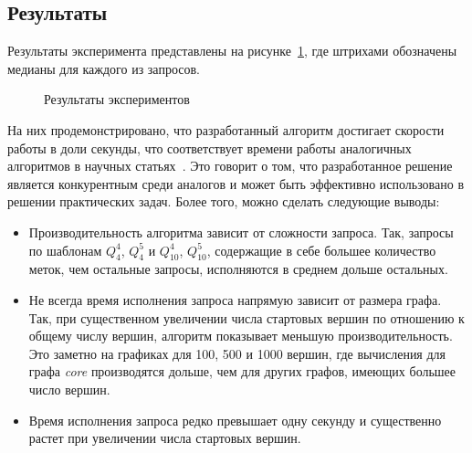 \subsection{Результаты}
Результаты эксперимента представлены на рисунке~\ref{fig:experiment}, где штрихами обозначены медианы для каждого из запросов.

\begin{figure}[ht]
  \noindent{}
  \caption{Результаты экспериментов}
  \label{fig:experiment}
\end{figure}

На них продемонстрировано, что разработанный алгоритм достигает скорости работы в доли секунды, что соответствует времени работы аналогичных алгоритмов в научных статьях~\cite{experimet_wang2020}. Это говорит о том, что разработанное решение является конкурентным среди аналогов и может быть эффективно использовано в решении практических задач. Более того, можно сделать следующие выводы:

\begin{itemize}
    \item Производительность алгоритма зависит от сложности запроса. Так, запросы по шаблонам $Q^4_4$, $Q^5_4$ и $Q^4_{10}$, $Q^5_{10}$, содержащие в себе большее количество меток, чем остальные запросы, исполняются в среднем дольше остальных. 
    \item Не всегда время исполнения запроса напрямую зависит от размера графа. Так, при существенном увеличении числа стартовых вершин по отношению к общему числу вершин, алгоритм показывает меньшую производительность. Это заметно на графиках для 100, 500 и 1000 вершин, где вычисления для графа \textit{core} производятся дольше, чем для других графов, имеющих большее число вершин.
    \item Время исполнения запроса редко превышает одну секунду и существенно растет при увеличении числа стартовых вершин.
\end{itemize}
